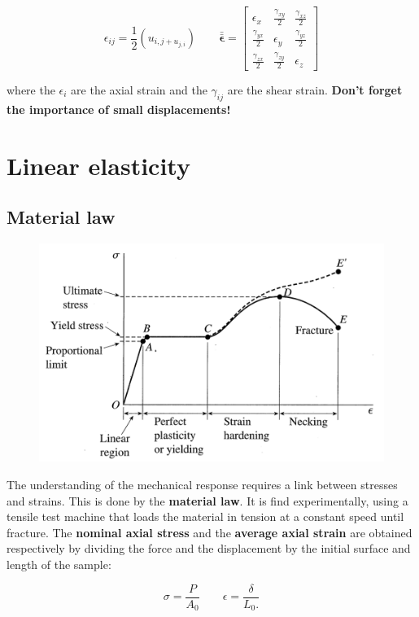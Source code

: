 			\begin{equation}
			\epsilon _{ij}= \frac{1}{2} (u_{i,j + u_{j,i}})\qquad \bm{\bar{ \bar{\epsilon}}} = 
			\left[
			\begin{array}{ccc}
			\epsilon _x &\frac{\gamma _{xy}}{2} &\frac{\gamma _{xz}}{2} \\
			\frac{\gamma _{yx}}{2} & \epsilon _y & \frac{\gamma _{yz}}{2}\\
			\frac{\gamma _{zx}}{2} & \frac{\gamma _{zy}}{2} & \epsilon _z
			\end{array}						
			\right]
			\end{equation}
			
			where the $\epsilon _i$ are the axial strain and the $\gamma _{ij}$ are the shear strain. \textbf{Don't forget the importance of small displacements!}
			
	\section{Linear elasticity}
		\subsection{Material law}
			\begin{figure}
			\vspace{-5mm}	
			\includegraphics[scale=0.3]{ch3/6}
			\end{figure}		
			The understanding of the mechanical response requires a link between stresses and strains. This is done by the \textbf{material law}. It is find experimentally, using a tensile test machine that loads the material in tension at a constant speed until fracture. The \textbf{nominal axial stress} and the \textbf{average axial strain} are obtained respectively by dividing the force and the displacement by the initial surface and length of the sample:
			
			\begin{equation}
			\sigma = \frac{P}{A_0} \qquad \epsilon = \frac{\delta}{L_0.}	
			\end{equation}			 